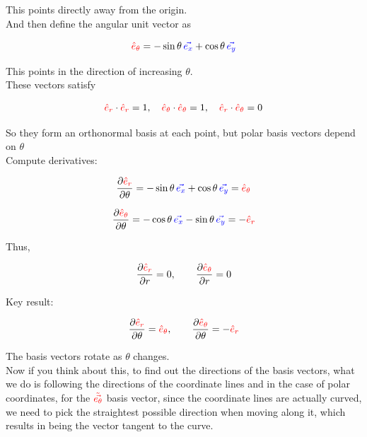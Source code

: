 This points directly away from the origin.\\
And then define the angular unit vector as

\[
\begingroup\color{red}\hat{e}_\theta\endgroup
= -\sin\theta \,\begingroup\color{blue}\vec{e_x}\endgroup
+ \cos\theta \,\begingroup\color{blue}\vec{e_y}\endgroup
\]

This points in the direction of increasing $\theta$.\\
These vectors satisfy

\[
\begingroup\color{red}\hat{e}_r\endgroup \cdot \begingroup\color{red}\hat{e}_r\endgroup = 1,
\quad
\begingroup\color{red}\hat{e}_\theta\endgroup \cdot \begingroup\color{red}\hat{e}_\theta\endgroup = 1,
\quad
\begingroup\color{red}\hat{e}_r\endgroup \cdot \begingroup\color{red}\hat{e}_\theta\endgroup = 0
\]

So they form an orthonormal basis at each point, but polar basis vectors depend on $\theta$\\

Compute derivatives:

\[
\frac{\partial \begingroup\color{red}\hat{e}_r\endgroup}{\partial \theta}
=
-\sin\theta\,\begingroup\color{blue}\vec{e_x}\endgroup
+
\cos\theta\,\begingroup\color{blue}\vec{e_y}\endgroup
=
\begingroup\color{red}\hat{e}_\theta\endgroup
\]

\[
\frac{\partial \begingroup\color{red}\hat{e}_\theta\endgroup}{\partial \theta}
=
-\cos\theta\,\begingroup\color{blue}\vec{e_x}\endgroup
-
\sin\theta\,\begingroup\color{blue}\vec{e_y}\endgroup
=
-\begingroup\color{red}\hat{e}_r\endgroup
\]

Thus,

\[
\frac{\partial \begingroup\color{red}\hat{e}_r\endgroup}{\partial r} = 0,
\qquad
\frac{\partial \begingroup\color{red}\hat{e}_\theta\endgroup}{\partial r} = 0
\]

Key result:

\[
\frac{\partial \begingroup\color{red}\hat{e}_r\endgroup}{\partial \theta} = \begingroup\color{red}\hat{e}_\theta\endgroup,
\qquad
\frac{\partial \begingroup\color{red}\hat{e}_\theta\endgroup}{\partial \theta} = -\begingroup\color{red}\hat{e}_r\endgroup
\]

The basis vectors rotate as $\theta$ changes.\\

Now if you think about this, to find out the directions of the basis vectors, what we do is
following the directions of the coordinate lines and in the case of polar coordinates, for the $\begingroup\color{red}\tilde{\vec{e_\theta}}\endgroup$
basis vector, since the coordinate lines are actually curved, we need to pick the straightest possible
direction when moving along it, which results in being the vector tangent to the curve.\\

